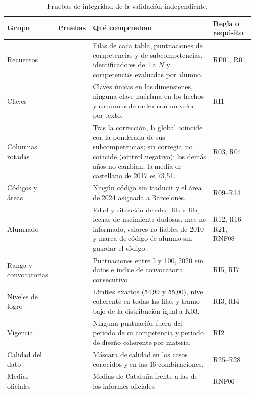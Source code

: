 \documentclass[12pt, a4paper, oneside]{report}
\begin{document}
\begin{table}[H]
\centering
\small
{}\renewcommand{\arraystretch}{1.1}
\begin{tabularx}{\textwidth}{@{} >{\raggedright\arraybackslash}p{2.6cm} >{\centering\arraybackslash}p{1.7cm} X >{\raggedright\arraybackslash}p{2.4cm} @{}}
\toprule
\textbf{Grupo} & \textbf{Pruebas} & \textbf{Qué comprueban} & \textbf{Regla o requisito} \\ \midrule
Recuentos & 4 & Filas de cada tabla, puntuaciones de competencias y de subcompetencias, identificadores de 1 a $N$ y competencias evaluadas por alumno. & RF01, R01 \\ \addlinespace
Claves & 3 & Claves únicas en las dimensiones, ninguna clave huérfana en los hechos y columnas de orden con un valor por texto. & RI1 \\ \addlinespace
Columnas rotadas & 4 & Tras la corrección, la global coincide con la ponderada de sus subcompetencias; sin corregir, no coincide (control negativo); los demás años no cambian; la media de castellano de 2017 es 73,51. & R03, R04 \\ \addlinespace
Códigos y áreas & 2 & Ningún código sin traducir y el área de 2024 asignada a Barcelonès. & R09--R14 \\ \addlinespace
Alumnado & 5 & Edad y situación de edad fila a fila, fechas de nacimiento dudosas, mes no informado, valores no fiables de 2010 y marca de código de alumno sin guardar el código. & R12, R16--R21, RNF08 \\ \addlinespace
Rango y convocatorias & 3 & Puntuaciones entre 0 y 100, 2020 sin datos e índice de convocatoria consecutivo. & RI5, RI7 \\ \addlinespace
Niveles de logro & 3 & Límites exactos (54,99 y 55,00), nivel coherente en todas las filas y tramo bajo de la distribución igual a K03. & RI3, RI4 \\ \addlinespace
Vigencia & 2 & Ninguna puntuación fuera del periodo de su competencia y periodo de diseño coherente por materia. & RI2 \\ \addlinespace
Calidad del dato & 3 & Máscara de calidad en los casos conocidos y en las 16 combinaciones. & R25--R28 \\ \addlinespace
Medias oficiales & 2 & Medias de Cataluña frente a las de los informes oficiales. & RNF06 \\ \bottomrule
\end{tabularx}
\caption{Pruebas de integridad de la validación independiente.}
\label{tab:pruebas}
\end{table}
\end{document}
